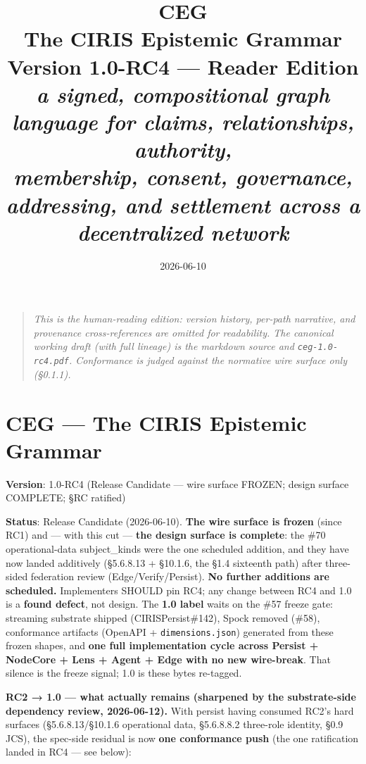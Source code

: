 \documentclass[11pt]{article}
\title{\vspace{-1cm}\Huge\bfseries\color{accent}CEG\\[6pt]\LARGE The CIRIS Epistemic Grammar\\[14pt]
\normalsize\mdseries Version 1.0-RC4 --- Reader Edition\\[2pt]
\itshape a signed, compositional graph language for claims, relationships, authority,\\
membership, consent, governance, addressing, and settlement across a decentralized network}
\author{}\date{2026-06-10}
\begin{document}
\maketitle\thispagestyle{empty}
\begin{quote}\itshape This is the human-reading edition: version history, per-path narrative, and
provenance cross-references are omitted for readability. The canonical working draft
(with full lineage) is the markdown source and \texttt{ceg-1.0-rc4.pdf}. Conformance is
judged against the normative wire surface only (\S0.1.1).\end{quote}
\clearpage
\tableofcontents
\clearpage

\section*{CEG — The CIRIS Epistemic Grammar}


\textbf{Version}: 1.0-RC4 (Release Candidate — wire surface FROZEN; design surface COMPLETE; §RC ratified)

\textbf{Status}: Release Candidate (2026-06-10). \textbf{The wire surface is frozen} (since RC1) and — with this cut — \textbf{the design surface is complete}: the \#70 operational-data subject\_kinds were the one scheduled addition, and they have now landed additively (§5.6.8.13 + §10.1.6, the §1.4 sixteenth path) after three-sided federation review (Edge/Verify/Persist). \textbf{No further additions are scheduled.} Implementers SHOULD pin RC4; any change between RC4 and 1.0 is a \textbf{found defect}, not design. The \textbf{1.0 label} waits on the \#57 freeze gate: streaming substrate shipped (CIRISPersist\#142), Spock removed (\#58), conformance artifacts (OpenAPI + \texttt{dimensions.json}) generated from these frozen shapes, and \textbf{one full implementation cycle across Persist + NodeCore + Lens + Agent + Edge with no new wire-break}. That silence is the freeze signal; 1.0 is these bytes re-tagged.


\textbf{RC2 → 1.0 — what actually remains (sharpened by the substrate-side dependency review, 2026-06-12).} With persist having consumed RC2's hard surfaces (§5.6.8.13/§10.1.6 operational data, §5.6.8.8.2 three-role identity, §0.9 JCS), the spec-side residual is now \textbf{one conformance push} (the one ratification landed in RC4 — see below):
\end{document}

